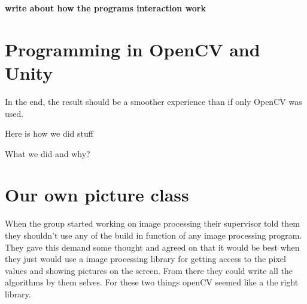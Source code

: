 \textbf{write about how the programs interaction work}
\section{Programming in OpenCV and Unity}

In the end, the result should be a smoother experience than if only OpenCV was used.

Here is how we did stuff

What we did and why?

\section{Our own picture class}
When the group started working on image processing their supervisor told them they shouldn't use any of the build in function of any image processing program. They gave this demand some thought and agreed on that it would be best when they just would use a image processing library for getting access to the pixel values and showing pictures on the screen. From there they could write all the algorithms by them selves. For these two things openCV seemed like a the right library.

